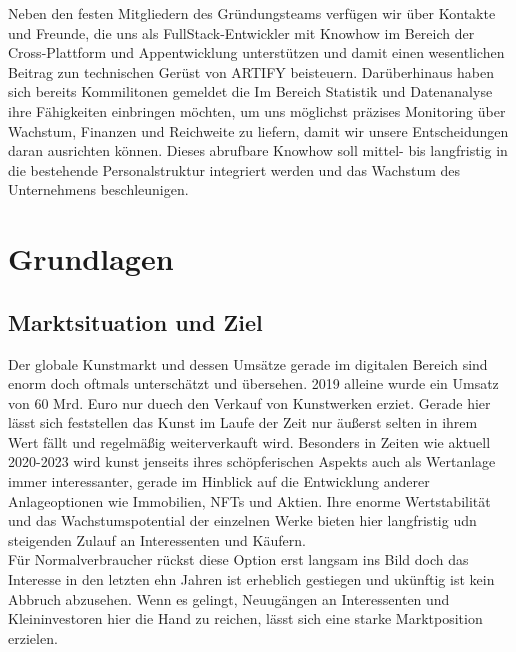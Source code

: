 \documentclass[11pt,a4paper]{report}
\begin{document}
Neben den festen Mitgliedern des Gründungsteams verfügen wir über Kontakte und Freunde, die uns als FullStack-Entwickler mit Knowhow im Bereich der Cross-Plattform und Appentwicklung unterstützen und damit einen wesentlichen Beitrag zun technischen Gerüst von ARTIFY beisteuern. Darüberhinaus haben sich bereits Kommilitonen gemeldet die Im Bereich Statistik und Datenanalyse ihre Fähigkeiten einbringen möchten, um uns möglichst präzises Monitoring über Wachstum, Finanzen und Reichweite zu liefern, damit wir unsere Entscheidungen daran ausrichten können. Dieses abrufbare Knowhow soll mittel- bis langfristig in die bestehende Personalstruktur integriert werden und das Wachstum des Unternehmens beschleunigen. 
\chapter{Grundlagen}
\section{Marktsituation und Ziel}
Der globale Kunstmarkt und dessen Umsätze gerade im digitalen Bereich sind enorm doch oftmals unterschätzt und übersehen. 2019 alleine wurde ein Umsatz von 60 Mrd. Euro nur duech den Verkauf von Kunstwerken erziet. Gerade hier lässt sich feststellen das Kunst im Laufe der Zeit nur äußerst selten in ihrem Wert fällt und regelmäßig weiterverkauft wird. Besonders in Zeiten wie aktuell 2020-2023 wird kunst jenseits ihres schöpferischen Aspekts auch als Wertanlage immer interessanter, gerade im Hinblick auf die Entwicklung anderer Anlageoptionen wie Immobilien, NFTs und Aktien. Ihre enorme Wertstabilität und das Wachstumspotential der einzelnen Werke bieten hier langfristig udn steigenden Zulauf an Interessenten und Käufern.\\
Für Normalverbraucher rückst diese Option erst langsam ins Bild doch das Interesse in den letzten ehn Jahren ist erheblich gestiegen und ukünftig ist kein Abbruch abzusehen. Wenn es gelingt, Neuugängen an Interessenten und Kleininvestoren hier die Hand zu reichen, lässt sich eine starke Marktposition erzielen. 
\end{document}
